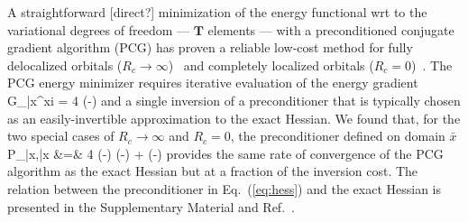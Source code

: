 \documentclass[aps,prl,twocolumn,reprint,amsmath,amssymb]{revtex4-1}
\begin{document}
A straightforward [direct?] minimization of the energy functional wrt to the variational degrees of freedom --- $\mathbf{T}$ elements --- with a preconditioned conjugate gradient algorithm (PCG) has proven a reliable low-cost method for fully delocalized orbitals ($R_c \rightarrow \infty$)~\cite{parrinello-galli} and completely localized orbitals ($R_c = 0$)~\cite{khaliullin2013efficient}. The PCG energy minimizer requires iterative evaluation of the energy gradient
%
\bea
{G_{\bar{x}\mu}}^{xi} \equiv {} = 4  (-)  
\eea
%
and a single inversion of a preconditioner that is typically chosen as an easily-invertible approximation to the exact Hessian. We found that, for the two special cases of $R_c \rightarrow \infty$ and $R_c = 0$, the preconditioner defined on domain $\bar{x}$
%
\bea
P_{\bar{x}\mu,\bar{x}\nu} &=& 4  (-) (-) + (-)  
\label{eq:hess}
\eea
%
provides the same rate of convergence of the PCG algorithm as the exact Hessian but at a fraction of the inversion cost. The relation between the preconditioner in Eq.~(\ref{eq:hess}) and the exact Hessian is presented in the Supplementary Material and Ref.~.
\end{document}
